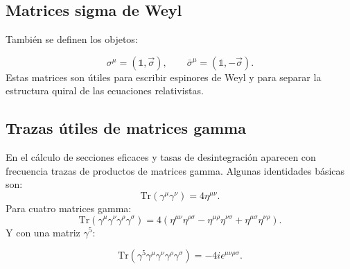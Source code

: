 \documentclass[a4paper,11pt]{book} %
\begin{document}
\subsection{Matrices sigma de Weyl}
\noindent
También se definen los objetos:

\begin{equation}
    \sigma^\mu
    =
    \left(
        \mathbb{1},
        \vec{\sigma}
    \right),
    \qquad
    \bar{\sigma}^\mu
    =
    \left(
        \mathbb{1},
        -\vec{\sigma}
    \right).
\end{equation}
\noindent
Estas matrices son útiles para escribir espinores de Weyl y para separar la
estructura quiral de las ecuaciones relativistas.

\subsection{Trazas útiles de matrices gamma}
\noindent
En el cálculo de secciones eficaces y tasas de desintegración aparecen con
frecuencia trazas de productos de matrices gamma. Algunas identidades básicas
son:
\begin{equation}
    \mathrm{Tr}
    \left(
        \gamma^\mu\gamma^\nu
    \right)
    =
    4\eta^{\mu\nu}.
\end{equation}
\noindent
Para cuatro matrices gamma:
\begin{equation}
    \mathrm{Tr}
    \left(
        \gamma^\mu\gamma^\nu\gamma^\rho\gamma^\sigma
    \right)
    =
    4
    \left(
        \eta^{\mu\nu}\eta^{\rho\sigma}
        -
        \eta^{\mu\rho}\eta^{\nu\sigma}
        +
        \eta^{\mu\sigma}\eta^{\nu\rho}
    \right).
\end{equation}
\noindent
Y con una matriz \(\gamma^5\):

\begin{equation}
    \mathrm{Tr}
    \left(
        \gamma^5
        \gamma^\mu
        \gamma^\nu
        \gamma^\rho
        \gamma^\sigma
    \right)
    =
    -4i\epsilon^{\mu\nu\rho\sigma}.
\end{equation}
\end{document}
